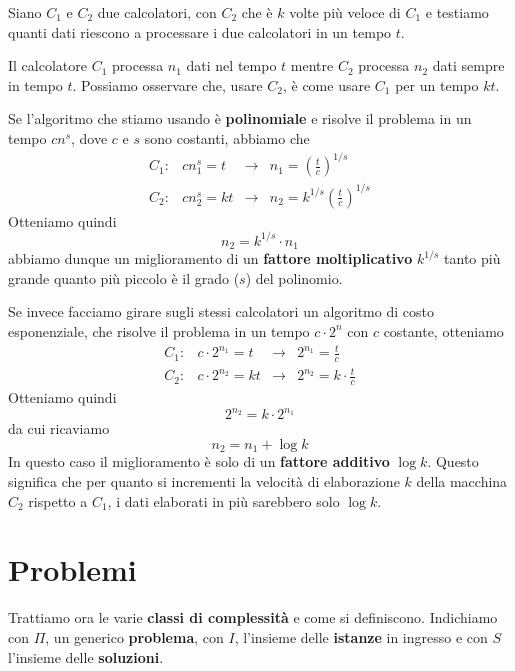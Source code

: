\begin{example}
	Siano $C_1$ e $C_2$ due calcolatori, con $C_2$ che \`e $k$ volte pi\`u veloce di $C_1$ e testiamo quanti dati
	riescono a processare i due calcolatori in un tempo $t$.

	Il calcolatore $C_1$ processa $n_1$ dati nel tempo $t$ mentre $C_2$ processa $n_2$ dati sempre in tempo $t$.
	Possiamo osservare che, usare $C_2$, \`e come usare $C_1$ per un tempo $kt$.

	Se l'algoritmo che stiamo usando \`e \textbf{polinomiale} e risolve il problema in un tempo $cn^s$, dove
	$c$ e $s$ sono costanti, abbiamo che
	\[	\begin{array}{llcl}
			C_1 : & c n_1^s = t  & \rightarrow &
			n_1 = \left( \displaystyle\frac{t}{c} \right)^{1/s} \\

			C_2 : & c n_2^s = kt & \rightarrow &
			n_2 = k^{1/s}\left( \displaystyle\frac{t}{c} \right)^{1/s}
		\end{array}
	\]
	Otteniamo quindi
	\[ n_2 = k^{1/s} \cdot n_1 \]
	abbiamo dunque un miglioramento di un \textbf{fattore moltiplicativo} $k^{1/s}$ tanto pi\`u grande quanto pi\`u
	piccolo \`e il grado ($s$) del polinomio.

	Se invece facciamo girare sugli stessi calcolatori un algoritmo di costo esponenziale, che risolve il problema in
	un tempo $c \cdot 2^n$ con $c$ costante, otteniamo
	\[
		\begin{array}{llcl}
			C_1 : & c \cdot 2^{n_1} = t   & \rightarrow & 2^{n_1} = \displaystyle\frac{t}{c}         \\
			C_2 : & c \cdot 2^{n_2} = k t & \rightarrow & 2^{n_2} = k \cdot \displaystyle\frac{t}{c}
		\end{array}
	\]
	Otteniamo quindi
	\[ 2^{n_2} = k \cdot 2^{n_1} \]
	da cui ricaviamo
	\[ n_2 = n_1 + \log k \]
	In questo caso il miglioramento \`e solo di un \textbf{fattore additivo} $\log k$. Questo significa che per
	quanto si incrementi la velocit\`a di elaborazione $k$ della macchina $C_2$ rispetto a $C_1$, i dati elaborati in
	pi\`u sarebbero solo $\log k$.
\end{example}

\section{Problemi}\label{problemi}
Trattiamo ora le varie \textbf{classi di complessit\`a} e come si definiscono. Indichiamo con $\Pi$, un generico
\textbf{problema}, con $I$, l'insieme delle \textbf{istanze} in ingresso e con $S$ l'insieme delle \textbf{soluzioni}.

